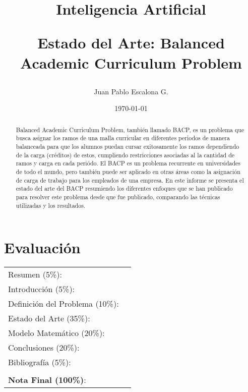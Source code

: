 \documentclass[letterpaper,10pt]{article}
\begin{document}
\title{Inteligencia Artificial \\ \begin{Large}Estado del Arte: Balanced Academic Curriculum Problem\end{Large}}
\author{Juan Pablo Escalona G.}
\date{\today}
\maketitle


\section*{Evaluación}

\begin{tabular}{ll}
Resumen (5\%): & \underline{\hspace{2cm}} \\
Introducción (5\%):  & \underline{\hspace{2cm}} \\
Definición del Problema (10\%):  & \underline{\hspace{2cm}} \\
Estado del Arte (35\%):  & \underline{\hspace{2cm}} \\
Modelo Matemático (20\%): &  \underline{\hspace{2cm}}\\
Conclusiones (20\%): &  \underline{\hspace{2cm}}\\
Bibliografía (5\%): & \underline{\hspace{2cm}}\\
 &  \\
\textbf{Nota Final (100\%)}:   & \underline{\hspace{2cm}}
\end{tabular}
\vspace{2cm}


\begin{abstract}
Balanced Academic Curriculum Problem, también llamado BACP, es un problema que busca asignar los ramos de una malla curricular en diferentes periodos de manera balanceada para que los alumnos puedan cursar exitosamente los ramos dependiendo de la carga (cr\'editos) de estos, cumpliendo restricciones asociadas al la cantidad de ramos y carga en cada periódo. El BACP es un problema recurrente en universidades de todo el mundo, pero tambi\'en puede ser aplicado en otras áreas como la asignación de carga de trabajo para los empleados de una empresa. En este informe se presenta el estado del arte del BACP resumiendo los diferentes enfoques que se han publicado para resolver este problema desde que fue publicado, comparando las t\'ecnicas utilizadas y los resultados.
\end{abstract}
\end{document}

